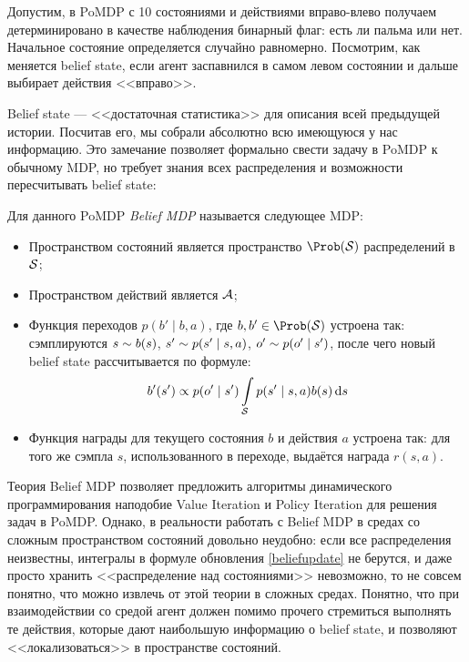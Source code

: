 \begin{exampleBox}[righthand ratio=0.6, sidebyside, sidebyside align=center, lower separated=false]{}
Допустим, в PoMDP с 10 состояниями и действиями вправо-влево получаем детерминировано в качестве наблюдения бинарный флаг: есть ли пальма или нет. Начальное состояние определяется случайно равномерно. Посмотрим, как меняется belief state, если агент заспавнился в самом левом состоянии и дальше выбирает действия <<вправо>>.

\tcblower
{}
\end{exampleBox}

Belief state --- <<достаточная статистика>> для описания всей предыдущей истории. Посчитав его, мы собрали абсолютно всю имеющуюся у нас информацию. Это замечание позволяет формально свести задачу в PoMDP к обычному MDP, но требует знания всех распределения и возможности пересчитывать belief state:

\begin{definition}
Для данного PoMDP \emph{Belief MDP} называется следующее MDP:
\begin{itemize}
    \item Пространством состояний является пространство $\Prob(\St)$ распределений в $\mathcal{S}$;
    \item Пространством действий является $\mathcal{A}$;
    \item Функция переходов $p(b' \mid b, a)$, где $b, b' \in \Prob(\St)$ устроена так: сэмплируются $s \HM\sim b(s)$, $s' \HM\sim p(s' \HM\mid s, a)$, $o' \HM\sim p(o' \mid s')$, после чего новый belief state рассчитывается по формуле:
    $$b'(s') \propto p(o' \mid s')\int\limits_{\mathcal{S}} p(s' \mid s, a) b(s) \mathop{}\!\mathrm{d} s $$
    \item Функция награды для текущего состояния $b$ и действия $a$ устроена так: для того же сэмпла $s$, использованного в переходе, выдаётся награда $r(s, a)$.
\end{itemize}
\end{definition}

Теория Belief MDP позволяет предложить алгоритмы динамического программирования наподобие Value Iteration и Policy Iteration для решения задач в PoMDP. Однако, в реальности работать с Belief MDP в средах со сложным пространством состояний довольно неудобно: если все распределения неизвестны, интегралы в формуле обновления \eqref{beliefupdate} не берутся, и даже просто хранить <<распределение над состояниями>> невозможно, то не совсем понятно, что можно извлечь от этой теории в сложных средах. Понятно, что при взаимодействии со средой агент должен помимо прочего стремиться выполнять те действия, которые дают наибольшую информацию о belief state, и позволяют <<локализоваться>> в пространстве состояний.

